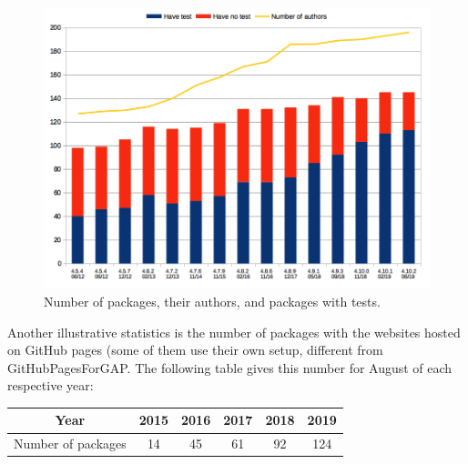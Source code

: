 \begin{figure}[!ht]
    \centering
    \includegraphics[width=\textwidth]{images/gap-package-tests}
    \caption{Number of \GAP packages, their authors, and packages with tests.}
    \label{fig:gap-package-tests}
\end{figure}

Another illustrative statistics is the number of \GAP packages
with the websites hosted on GitHub pages (some of them use
their own setup, different from {\sf GitHubPagesForGAP}.
The following table gives this number for August of each respective year:

\begin{center}
\begin{tabular}{| c | c | c | c | c | c |} 
\hline
Year & 2015 & 2016 & 2017 & 2018 & 2019 \\
\hline
Number of packages & 14 & 45 & 61 & 92 & 124 \\
\hline
\end{tabular}
\end{center}

